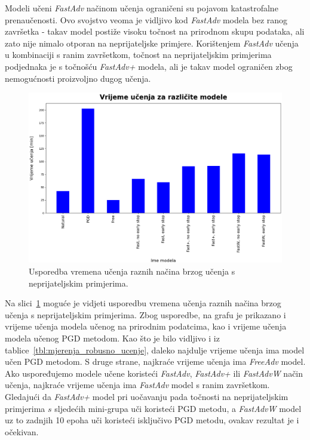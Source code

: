 \documentclass[times, utf8, zavrsni, numeric]{fer}
\begin{document}
Modeli učeni \textit{FastAdv} načinom učenja ograničeni su pojavom katastrofalne prenaučenosti. 
Ovo svojstvo veoma je vidljivo kod \textit{FastAdv} modela bez ranog završetka - takav model postiže visoku točnost na prirodnom skupu podataka, ali zato nije nimalo otporan na neprijateljske primjere.
Korištenjem \textit{FastAdv} učenja u kombinaciji s ranim završetkom, točnost na neprijateljskim primjerima podjednaka je s točnošću \textit{FastAdv+} modela,
ali je takav model ograničen zbog nemogućnosti proizvoljno dugog učenja.

\begin{figure}[htb]
    \centering
    \includegraphics[scale=0.42]{../stats/stats_comparison_train_time.png}
    \caption{Usporedba vremena učenja raznih načina brzog učenja s neprijateljskim primjerima.}
    \label{fig:train_time_comparison}
\end{figure}

\pagebreak

Na slici~\ref{fig:train_time_comparison} moguće je vidjeti usporedbu vremena učenja raznih načina brzog učenja s neprijateljskim primjerima.
Zbog usporedbe, na grafu je prikazano i vrijeme učenja modela učenog na prirodnim podatcima, kao i vrijeme učenja modela učenog PGD metodom.
Kao što je bilo vidljivo i iz tablice~\ref{tbl:mjerenja_robusno_ucenje}, daleko najdulje vrijeme učenja ima model učen PGD metodom.
S druge strane, najkraće vrijeme učenja ima \textit{FreeAdv} model. 
Ako uspoređujemo modele učene koristeći \textit{FastAdv}, \textit{FastAdv+} ili \textit{FastAdvW} način učenja, najkraće vrijeme učenja ima \textit{FastAdv} model s ranim završetkom.
Gledajući da \textit{FastAdv+} model pri uočavanju pada točnosti na neprijateljskim primjerima $s$ sljedećih mini-grupa uči koristeći PGD metodu, 
a \textit{FastAdvW} model uz to zadnjih 10 epoha uči koristeći isključivo PGD metodu, ovakav rezultat je i očekivan.
\end{document}
